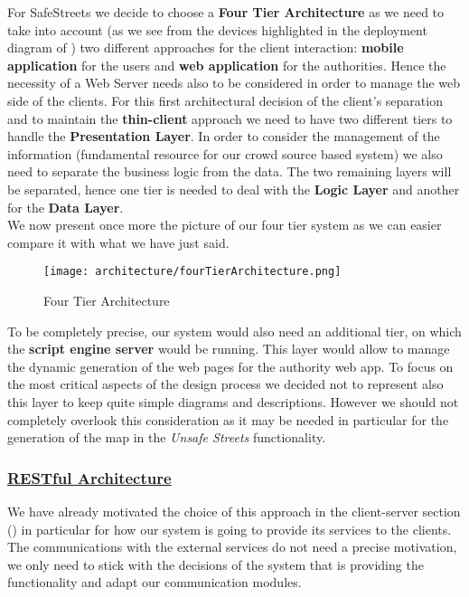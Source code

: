 			For SafeStreets we decide to choose a \textbf{Four Tier Architecture} as we need to take into account (as we see from the devices highlighted in the deployment diagram of ) two different approaches for the client interaction: \textbf{mobile application} for the users and \textbf{web application} for the authorities. Hence the necessity of a Web Server needs also to be considered in order to manage the web side of the clients. For this first architectural decision of the client's separation and to maintain the \textbf{thin-client} approach we need to have two different tiers to handle the \textbf{Presentation Layer}. In order to consider the management of the information (fundamental resource for our crowd source based system) we also need to separate the business logic from the data. The two remaining layers will be separated, hence one tier is needed to deal with the \textbf{Logic Layer} and another for the \textbf{Data Layer}.\\
			
			We now present once more the picture of our four tier system as we can easier compare it with what we have just said.
			
			\begin{figure}[h!]
				\centering
				\texttt{[image: architecture/fourTierArchitecture.png]}
				\caption{Four Tier Architecture}
			\end{figure}
		
			To be completely precise, our system would also need an additional tier, on which the \textbf{script engine server} would be running. This layer would allow to manage the dynamic generation of  the web pages for the authority web app. To focus on the most critical aspects of the design process we decided not to represent also this layer to keep quite simple diagrams and descriptions. However we should not completely overlook this consideration as it may be needed in particular for the generation of the map in the \emph{Unsafe Streets} functionality.
			
		\subsubsection[RESTful Architecture]{\hyperlink{toc}{RESTful Architecture}}
			\label{sec:RESTDecision}
			
			We have already motivated the choice of this approach in the client-server section () in particular for how our system is going to provide its services to the clients. The communications with the external services do not need a precise motivation, we only need to stick with the decisions of the system that is providing the functionality and adapt our communication modules.\\
			
